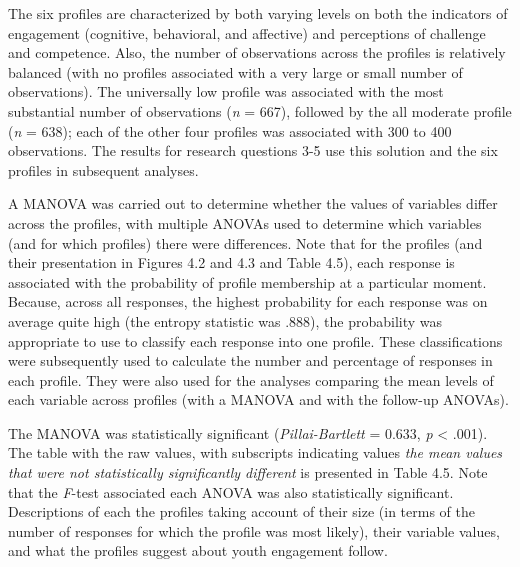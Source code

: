 \documentclass[]{book}
\theoremstyle{definition}
\theoremstyle{definition}
\theoremstyle{definition}
\theoremstyle{remark}
\begin{document}
The six profiles are characterized by both varying levels on both the
indicators of engagement (cognitive, behavioral, and affective) and
perceptions of challenge and competence. Also, the number of
observations across the profiles is relatively balanced (with no
profiles associated with a very large or small number of observations).
The universally low profile was associated with the most substantial
number of observations (\emph{n} = 667), followed by the all moderate
profile (\emph{n} = 638); each of the other four profiles was associated
with 300 to 400 observations. The results for research questions 3-5 use
this solution and the six profiles in subsequent analyses.

A MANOVA was carried out to determine whether the values of variables
differ across the profiles, with multiple ANOVAs used to determine which
variables (and for which profiles) there were differences. Note that for
the profiles (and their presentation in Figures 4.2 and 4.3 and Table
4.5), each response is associated with the probability of profile
membership at a particular moment. Because, across all responses, the
highest probability for each response was on average quite high (the
entropy statistic was .888), the probability was appropriate to use to
classify each response into one profile. These classifications were
subsequently used to calculate the number and percentage of responses in
each profile. They were also used for the analyses comparing the mean
levels of each variable across profiles (with a MANOVA and with the
follow-up ANOVAs).

The MANOVA was statistically significant (\emph{Pillai-Bartlett} =
0.633, \emph{p} \textless{} .001). The table with the raw values, with
subscripts indicating values \emph{the mean values that were not
statistically significantly different} is presented in Table 4.5. Note
that the \emph{F}-test associated each ANOVA was also statistically
significant. Descriptions of each the profiles taking account of their
size (in terms of the number of responses for which the profile was most
likely), their variable values, and what the profiles suggest about
youth engagement follow.
\end{document}

